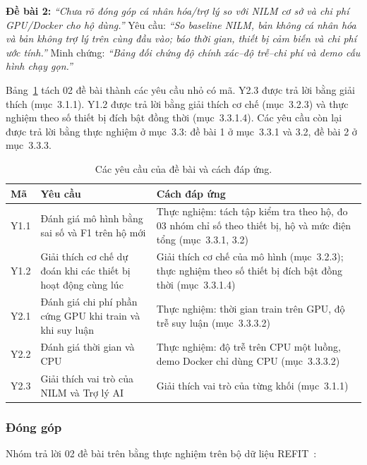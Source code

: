 \textbf{Đề bài 2:} \textit{“Chưa rõ đóng góp cá nhân hóa/trợ lý so với NILM cơ sở và chi phí GPU/Docker cho hộ dùng.”} Yêu cầu: \textit{“So baseline NILM, bản không cá nhân hóa và bản không trợ lý trên cùng đầu vào; báo thời gian, thiết bị cảm biến và chi phí ước tính.”} Minh chứng: \textit{“Bảng đối chứng độ chính xác–độ trễ–chi phí và demo cấu hình chạy gọn.”}

Bảng~\ref{nilm:tab1} tách 02 đề bài thành các yêu cầu nhỏ có mã. Y2.3 được trả lời bằng giải thích (mục~3.1.1). Y1.2 được trả lời bằng giải thích cơ chế (mục~3.2.3) và thực nghiệm theo số thiết bị đích bật đồng thời (mục~3.3.1.4). Các yêu cầu còn lại được trả lời bằng thực nghiệm ở mục~3.3: đề bài 1 ở mục~3.3.1 và 3.2, đề bài 2 ở mục~3.3.3.


\begin{table}[H]
\centering
\caption{Các yêu cầu của đề bài và cách đáp ứng.}\label{nilm:tab1}
\small
\setlength{\tabcolsep}{3.5pt}\renewcommand{\arraystretch}{1.12}
\begin{tabularx}{\linewidth}{|l|X|X|}
\hline
\textbf{Mã} & \textbf{Yêu cầu} & \textbf{Cách đáp ứng} \\ \hline
Y1.1 & Đánh giá mô hình bằng sai số và F1 trên hộ mới & Thực nghiệm: tách tập kiểm tra theo hộ, đo 03 nhóm chỉ số theo thiết bị, hộ và mức điện tổng (mục~3.3.1, 3.2) \\ \hline
Y1.2 & Giải thích cơ chế dự đoán khi các thiết bị hoạt động cùng lúc & Giải thích cơ chế của mô hình (mục~3.2.3); thực nghiệm theo số thiết bị đích bật đồng thời (mục~3.3.1.4) \\ \hline
Y2.1 & Đánh giá chi phí phần cứng GPU khi train và khi suy luận & Thực nghiệm: thời gian train trên GPU, độ trễ suy luận (mục~3.3.3.2) \\ \hline
Y2.2 & Đánh giá thời gian và CPU & Thực nghiệm: độ trễ trên CPU một luồng, demo Docker chỉ dùng CPU (mục~3.3.3.2) \\ \hline
Y2.3 & Giải thích vai trò của NILM và Trợ lý AI & Giải thích vai trò của từng khối (mục~3.1.1) \\ \hline
\end{tabularx}
\end{table}

\subsubsection{Đóng góp}

Nhóm trả lời 02 đề bài trên bằng thực nghiệm trên bộ dữ liệu REFIT~\citep{murray2017}:

